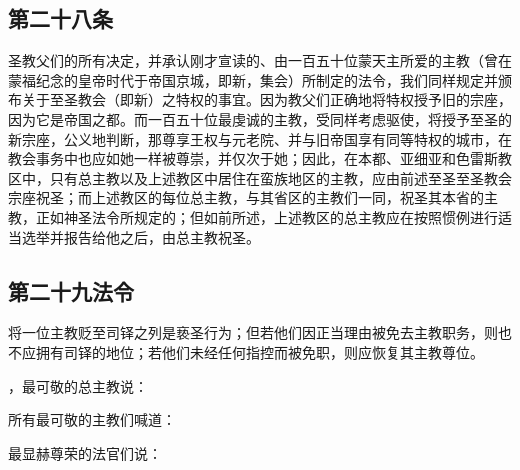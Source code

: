 \subsection{第二十八条}

圣教父们的所有决定，并承认刚才宣读的、由一百五十位蒙天主所爱的主教（曾在蒙福纪念的皇帝时代于帝国京城，即新，集会）所制定的法令，我们同样规定并颁布关于至圣教会（即新）之特权的事宜。因为教父们正确地将特权授予旧的宗座，因为它是帝国之都。而一百五十位最虔诚的主教，受同样考虑驱使，将授予至圣的新宗座，公义地判断，那尊享王权与元老院、并与旧帝国享有同等特权的城市，在教会事务中也应如她一样被尊崇，并仅次于她；因此，在本都、亚细亚和色雷斯教区中，只有总主教以及上述教区中居住在蛮族地区的主教，应由前述至圣至圣教会宗座祝圣；而上述教区的每位总主教，与其省区的主教们一同，祝圣其本省的主教，正如神圣法令所规定的；但如前所述，上述教区的总主教应在按照惯例进行适当选举并报告给他之后，由总主教祝圣。\par


\subsection{第二十九法令}

将一位主教贬至司铎之列是亵圣行为；但若他们因正当理由被免去主教职务，则也不应拥有司铎的地位；若他们未经任何指控而被免职，则应恢复其主教尊位。\par

，最可敬的总主教说：\par

所有最可敬的主教们喊道：\par

\par

最显赫尊荣的法官们说：\par

\par

